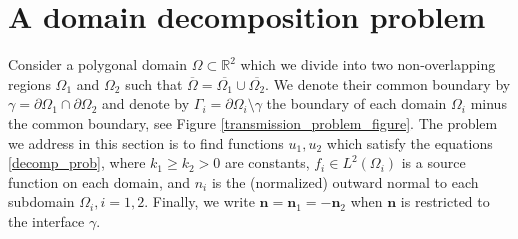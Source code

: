 \section{A domain decomposition problem}\label{domain_decomp_problem}

Consider a polygonal domain \(\Omega \subset \mathbb{R}^2\) which we divide into two non-overlapping regions \(\Omega_1\) and \(\Omega_2\) such that \(\overline{\Omega} = \overline{\Omega_1} \cup \overline{\Omega_2}\). We denote their common boundary by \(\gamma = \partial\Omega_1 \cap \partial\Omega_2\) and denote by \(\Gamma_i = \partial\Omega_i\setminus{\gamma}\) the boundary of each domain \(\Omega_i\) minus the common boundary, see Figure \ref{transmission_problem_figure}. The problem we address in this section is to find functions \(u_1, u_2\) which satisfy the equations \eqref{decomp_prob}, where \(k_1 \geq k_2 > 0\) are constants, \(f_i \in L^2(\Omega_i)\) is a source function on each domain, and \(n_i\) is the (normalized) outward normal to each subdomain \(\Omega_i, i=1, 2\). Finally, we write \(\boldsymbol{n}=\boldsymbol{n}_1=-\boldsymbol{n}_2\) when \(\boldsymbol{n}\) is restricted to the interface \(\gamma\).

